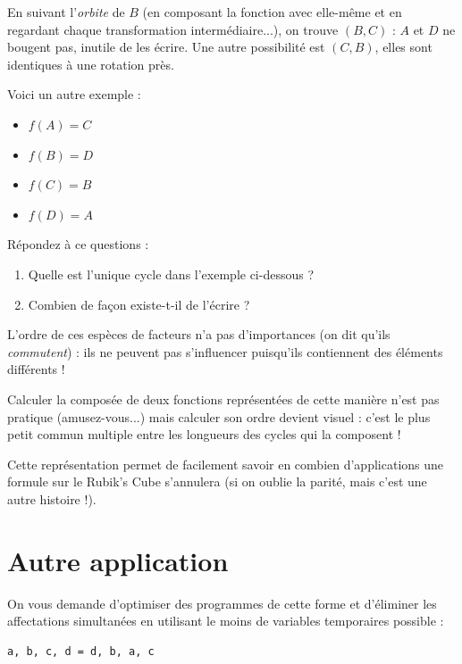 \documentclass[11pt,a4paper,oneside]{book}
\begin{document}
En suivant l'\emph{orbite} de $B$ (en composant la fonction avec elle-même et
en regardant chaque transformation intermédiaire...),
on trouve $(B,C)$ : $A$ et $D$ ne bougent pas, inutile de les écrire.
Une autre possibilité est $(C,B)$, elles sont identiques à une rotation près.

Voici un autre exemple :
\begin{itemize}
\item $f(A)=C$
\item $f(B)=D$
\item $f(C)=B$
\item $f(D)=A$
\end{itemize}

Répondez à ce questions :
\begin{enumerate}
\item Quelle est l'unique cycle dans l'exemple ci-dessous ?
\item Combien de façon existe-t-il de l'écrire ?
\end{enumerate}

L'ordre de ces espèces de facteurs n'a pas d'importances (on dit qu'ils
\emph{commutent}) : ils ne peuvent pas s'influencer puisqu'ils
contiennent des éléments différents !

Calculer la composée de deux fonctions représentées de cette manière n'est pas
pratique (amusez-vous...) mais calculer son ordre devient visuel : c'est le plus
petit commun multiple entre les longueurs des cycles qui la composent !

Cette représentation permet de facilement savoir en combien d'applications une
formule sur le Rubik's Cube s'annulera (si on oublie la parité, mais c'est une
autre histoire !).

\section{Autre application} %
On vous demande d'optimiser des programmes de cette forme et d'éliminer les
affectations simultanées en utilisant le moins de variables temporaires
possible :
\begin{verbatim}
a, b, c, d = d, b, a, c
\end{verbatim}

\end{document}
